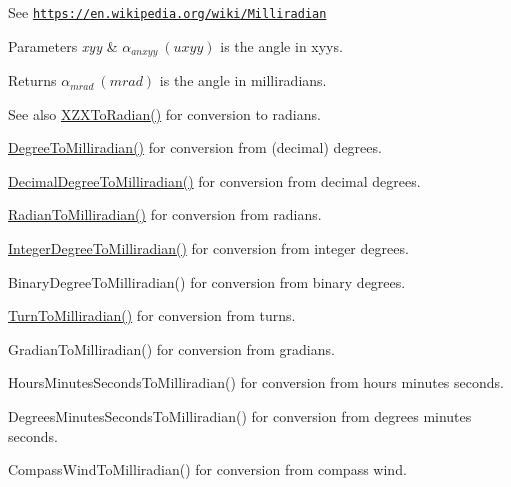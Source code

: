 See \href{https://en.wikipedia.org/wiki/Milliradian}{\tt https\+://en.\+wikipedia.\+org/wiki/\+Milliradian} 
\begin{DoxyParams}{Parameters}
{\em xyy} & $\alpha_{anxyy}\ (uxyy)$ is the angle in xyys. \\
\hline
\end{DoxyParams}
\begin{DoxyReturn}{Returns}
$\alpha_{mrad}\ (mrad)$ is the angle in milliradians. 
\end{DoxyReturn}
\begin{DoxySeeAlso}{See also}
\mbox{\hyperlink{group___e_g_x_math-_angle_conversions-_x_z_x_gad7d309239e80a848c661919f71fc22bd}{X\+Z\+X\+To\+Radian()}} for conversion to radians. 

\mbox{\hyperlink{group___e_g_x_math-_angle_conversions-_degree_gae4fa6c2d3805430760783650cfbfdb11}{Degree\+To\+Milliradian()}} for conversion from (decimal) degrees. 

\mbox{\hyperlink{group___e_g_x_math-_angle_conversions-_decimal_degree_gab567d02d4692d9642a4ad219e479713a}{Decimal\+Degree\+To\+Milliradian()}} for conversion from decimal degrees. 

\mbox{\hyperlink{group___e_g_x_math-_angle_conversions-_radian_gaea391f0cca39b05e298dd1cae162e7f1}{Radian\+To\+Milliradian()}} for conversion from radians. 

\mbox{\hyperlink{group___e_g_x_math-_angle_conversions-_integer_degree_ga5379a68bdff5cc4fab5bb1ba06ef9453}{Integer\+Degree\+To\+Milliradian()}} for conversion from integer degrees. 

Binary\+Degree\+To\+Milliradian() for conversion from binary degrees. 

\mbox{\hyperlink{group___e_g_x_math-_angle_conversions-_turn_ga2aea2621472294ce4c25ac7e55db51c6}{Turn\+To\+Milliradian()}} for conversion from turns. 

Gradian\+To\+Milliradian() for conversion from gradians. 

Hours\+Minutes\+Seconds\+To\+Milliradian() for conversion from hours minutes seconds. 

Degrees\+Minutes\+Seconds\+To\+Milliradian() for conversion from degrees minutes seconds. 

Compass\+Wind\+To\+Milliradian() for conversion from compass wind. 
\end{DoxySeeAlso}
\mbox{\label{group___e_g_x_math-_angle_conversions-_x_z_x_gad7d309239e80a848c661919f71fc22bd}} 
